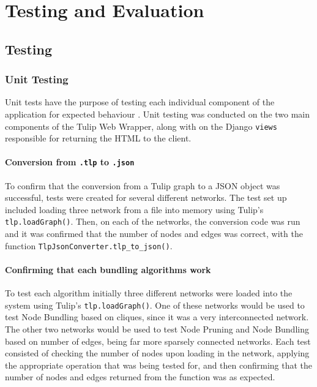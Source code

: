 \documentclass[../dissertation.tex]{subfiles}
\begin{document}
\chapter{Testing and Evaluation}
\label{chap:testing-eval}

\section{Testing}

\subsection{Unit Testing}

Unit tests have the purpose of testing each individual component of the application for expected behaviour \cite{runeson2006survey}. Unit testing was conducted on the two main components of the Tulip Web Wrapper, along with on the Django \texttt{views} responsible for returning the HTML to the client. 

\subsubsection{Conversion from \texttt{.tlp} to \texttt{.json}}

To confirm that the conversion from a Tulip graph to a JSON object was successful, tests were created for several different networks. The test set up included loading three network from a file into memory using Tulip's \texttt{tlp.loadGraph()}. Then, on each of the networks, the conversion code was run and it was confirmed that the number of nodes and edges was correct, with the function \texttt{TlpJsonConverter.tlp\_to\_json()}.

\subsubsection{Confirming that each bundling algorithms work}

To test each algorithm initially three different networks were loaded into the system using Tulip's \texttt{tlp.loadGraph()}. One of these networks would be used to test Node Bundling based on cliques, since it was a very interconnected network. The other two networks would be used to test Node Pruning and Node Bundling based on number of edges, being far more sparsely connected networks. Each test consisted of checking the number of nodes upon loading in the network, applying the appropriate operation that was being tested for, and then confirming that the number of nodes and edges returned from the function was as expected.
\end{document}

